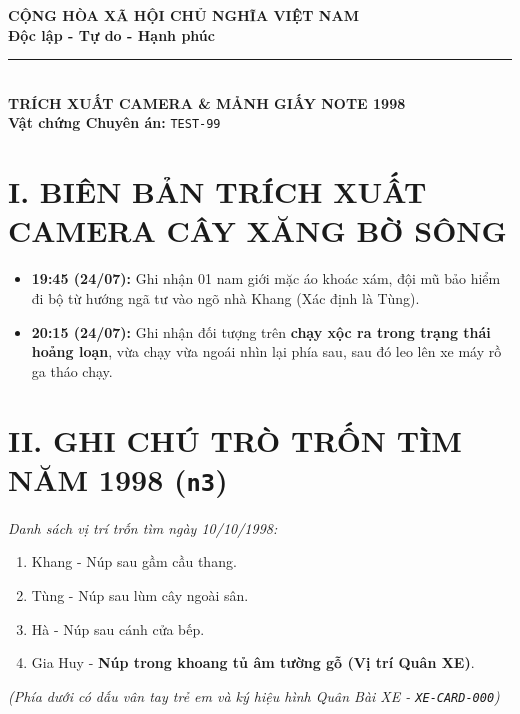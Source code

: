 \documentclass[12pt,a4paper]{article}
\begin{document}
\begin{center}
    \textbf{\Large CỘNG HÒA XÃ HỘI CHỦ NGHĨA VIỆT NAM}\\
    \textbf{\large Độc lập - Tự do - Hạnh phúc}\\
    \rule{8cm}{0.5pt}\\[0.5cm]
    
    \textbf{\LARGE TRÍCH XUẤT CAMERA \& MẢNH GIẤY NOTE 1998}\\
    \textbf{Vật chứng Chuyên án:} \texttt{TEST-99}
\end{center}

\vspace{0.3cm}

\section*{I. BIÊN BẢN TRÍCH XUẤT CAMERA CÂY XĂNG BỜ SÔNG}
\begin{tcolorbox}[colback=gray!10!white,colframe=black!75!black,title=\textbf{CAMERA AN NINH CÂY XĂNG SỐ 09 (Cách 300m)}]
\begin{itemize}
    \item \textbf{19:45 (24/07):} Ghi nhận 01 nam giới mặc áo khoác xám, đội mũ bảo hiểm đi bộ từ hướng ngã tư vào ngõ nhà Khang (Xác định là Tùng).
    \item \textbf{20:15 (24/07):} Ghi nhận đối tượng trên \textbf{chạy xộc ra trong trạng thái hoảng loạn}, vừa chạy vừa ngoái nhìn lại phía sau, sau đó leo lên xe máy rồ ga tháo chạy.
\end{itemize}
\end{tcolorbox}

\section*{II. GHI CHÚ TRÒ TRỐN TÌM NĂM 1998 (\texttt{n3})}

\begin{tcolorbox}[colback=yellow!5!white,colframe=yellow!75!black,title=\textbf{MẢNH GIẤY NOTE Ố VÀNG CẤT TRONG KHOANG TỦ ÂM TƯỜNG}]
\textit{Danh sách vị trí trốn tìm ngày 10/10/1998:}
\begin{enumerate}
    \item Khang - Núp sau gầm cầu thang.
    \item Tùng - Núp sau lùm cây ngoài sân.
    \item Hà - Núp sau cánh cửa bếp.
    \item Gia Huy - \textbf{Núp trong khoang tủ âm tường gỗ (Vị trí Quân XE)}.
\end{enumerate}
\textit{(Phía dưới có dấu vân tay trẻ em và ký hiệu hình Quân Bài XE - \texttt{XE-CARD-000})}
\end{tcolorbox}
\end{document}
